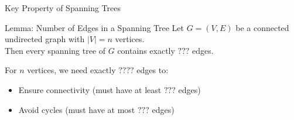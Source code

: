 \documentclass{beamer}
\begin{document}
\begin{frame}{Key Property of Spanning Trees}
\begin{block}{Lemma: Number of Edges in a Spanning Tree}
Let $G = (V, E)$ be a connected undirected graph with $|V| = n$ vertices. \\
Then every spanning tree of $G$ contains exactly $???$ edges.
\end{block}

\begin{center}
\end{center}

For $n$ vertices, we need exactly $????$ edges to:
\begin{itemize}
\item Ensure connectivity (must have at least $???$ edges)
\item Avoid cycles (must have at most $???$ edges)
\end{itemize}
\end{frame}
\end{document}
